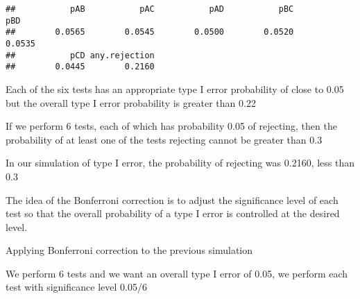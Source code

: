 \documentclass[
]{article}
\begin{document}
\begin{verbatim}
##           pAB           pAC           pAD           pBC           pBD 
##        0.0565        0.0545        0.0500        0.0520        0.0535 
##           pCD any.rejection 
##        0.0445        0.2160
\end{verbatim}

Each of the six tests has an appropriate type I error probability of
close to 0.05 but the overall type I error probability is greater than
0.22

If we perform 6 tests, each of which has probability 0.05 of rejecting,
then the probability of at least one of the tests rejecting cannot be
greater than 0.3

In our simulation of type I error, the probability of rejecting was
0.2160, less than 0.3

The idea of the Bonferroni correction is to adjust the significance
level of each test so that the overall probability of a type I error is
controlled at the desired level.

Applying Bonferroni correction to the previous simulation

We perform 6 tests and we want an overall type I error of 0.05, we
perform each test with significance level 0.05/6
\end{document}
